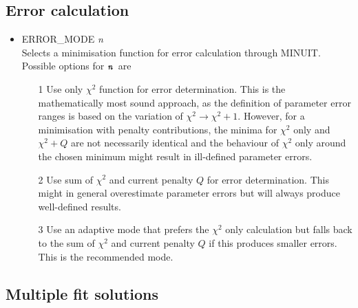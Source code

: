 \documentclass[a4paper,10pt]{article}
\def\enn{\mbox{\ttfamily\textit{n}\rmfamily}}
\def\tt{\ttfamily}
\def\rm{\rmfamily}
\begin{document}
\subsection{Error calculation}

\begin{itemize}
\item
\tt ERROR\_MODE \textit{n}\rm\\
Selects a minimisation function for error calculation through MINUIT. Possible options for $\enn$ are
\vspace{-0.5em}\begin{enumerate}
\item[1\:\:] Use only $\chi^2$ function for error determination. This is the mathematically most sound approach, as the definition of
parameter error ranges is based on the variation of $\chi^2 \rightarrow \chi^2 +1$. However, for a
minimisation with penalty contributions, the minima for $\chi^2$ only and $\chi^2+Q$ are not necessarily
identical and the behaviour of $\chi^2$ only around the chosen minimum might result in ill-defined parameter errors.
\item[2\:\:] Use sum of $\chi^2$ and current penalty $Q$ for error determination. This might in general overestimate
parameter errors but will always produce well-defined results.
\item[3\:\:] Use an adaptive mode that prefers the $\chi^2$ only calculation but falls back to the 
sum of $\chi^2$ and current penalty $Q$ if this produces smaller errors. This is the recommended mode.
\end{enumerate}

\end{itemize}

\subsection{Multiple fit solutions}
\end{document}
